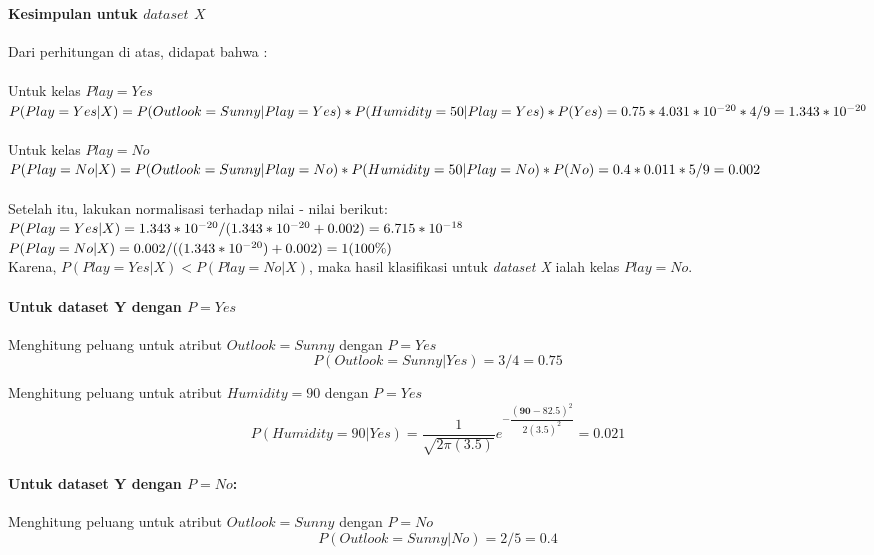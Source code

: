 	\paragraph{Kesimpulan untuk $dataset$ $X$}
	Dari perhitungan di atas, didapat bahwa : \\ \\
	Untuk kelas $Play=Yes$ \\
	$P(Play=Yes|X) \\
	= P(Outlook=Sunny|Play=Yes)*P(Humidity=50|Play=Yes)*P(Yes) \\
	= 0.75 * 4.031*10^{-20} * 4/9 \\
	= 1.343*10^{-20}$ \\ \\
	Untuk kelas $Play=No$ \\
	$P(Play=No|X) \\
	= P(Outlook=Sunny|Play=No)*P(Humidity=50|Play=No)*P(No) \\
	= 0.4 * 0.011 * 5/9 \\
	= 0.002$ \\ \\
	Setelah itu, lakukan normalisasi terhadap nilai - nilai berikut: \\
	$P(Play=Yes|X) = 1.343*10^{-20} / (1.343*10^{-20} + 0.002) \\
	= 6.715*10^{-18}$ \\
	$P(Play=No|X) = 0.002 / ((1.343*10^{-20}) + 0.002) \\
	= 1 (100\%)$ \\
	
	Karena, $P(Play=Yes|X) < P(Play=No|X)$, maka hasil klasifikasi untuk \textit{dataset X} ialah kelas $Play=No$.
	
	\paragraph{Untuk dataset Y dengan $P=Yes$}
	Menghitung peluang untuk atribut $Outlook=Sunny$ dengan $P=Yes$
	\begin{equation}
			P(Outlook=Sunny|Yes) = 3/4 
			= 0.75
	\end{equation}
	
	Menghitung peluang untuk atribut $Humidity=90$ dengan $P=Yes$
		\begin{equation}
			P(Humidity=90|Yes) 
			= \dfrac{1}{\sqrt{2\pi(3.5)}}e^{-\dfrac{(\textbf{90}-82.5)^2}{2(3.5)^2}}
			= 0.021
		\end{equation}
	
	\paragraph{Untuk dataset Y dengan $P=No$:}
	Menghitung peluang untuk atribut $Outlook=Sunny$ dengan $P=No$
	\begin{equation}
				P(Outlook=Sunny|No)
				= 2/5 
				= 0.4
		\end{equation}
	
